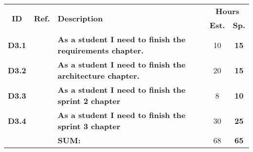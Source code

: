   \label{tab:sprint3Documentationstories}
 \def\arraystretch{1.25}
 
\begin{longtable}{ccXcc}

\toprule[0.5mm]
\multirow{2}{*}{\textbf{ID}} &
\multirow{2}{*}{\textbf{Ref.}} & \multirow{2}{*}{\textbf{Description}} & \multicolumn{2}{c}{\textbf{Hours}} \\
 					& & & \textbf{Est.} & \textbf{Sp.} \\
\midrule

\textbf{D3.1} 	&   & {\bf As a student I need to finish the requirements chapter.} 			& 	10	& \textbf{ 15} \\

\textbf{D3.2} 	&   & {\bf As a student I need to finish the architecture chapter.} 			& 	20  & \textbf{ 15} \\
	
\textbf{D3.3} 	&	& {\bf As a student I need to finish the sprint 2 chapter} 					&   8  & \textbf{10} \\

\textbf{D3.4} 	&	& {\bf As a student I need to finish the sprint 3 chapter} 					& 	30 & \textbf{25} \\


\midrule
		
				&	& \textbf{SUM:}		&		68	& \textbf{65}
 \\																			
\bottomrule[0.5mm]
\end{longtable}
